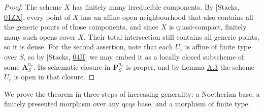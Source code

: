 \documentclass[11pt]{article}
\begin{document}
\begin{proof}[{Proof}]\label{bp66}%
The scheme \(X\) has finitely many irreducible components. By [Stacks, \href{https://stacks.math.columbia.edu/tag/01ZX}{01ZX}], every point of \(X\) has an affine open neighbourhood that also contains all the generic points of those components, and since \(X\) is quasi-compact, finitely many such opens cover \(X\). Their total intersection still contains all generic points, so it is dense. For the second assertion, note that each \(U_r\) is affine of finite type over \(S\), so by [Stacks, \href{https://stacks.math.columbia.edu/tag/04II}{04II}] we may embed it as a locally closed subscheme of some \(\mathbf A^{n_r}_S\). Its schematic closure in \(\mathbf P^{n_r}_S\) is proper, and by Lemma \hyperref[bp9]{A.3} the scheme \(U_r\) is open in that closure.
\end{proof}

\label{bp67}%
We prove the theorem in three steps of increasing generality: a Noetherian base, a finitely presented morphism over any qcqs base, and a morphism of finite type.
\end{document}
